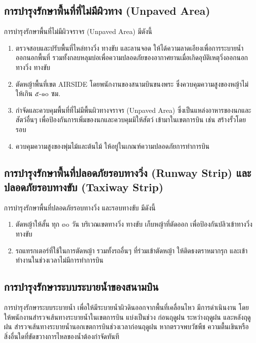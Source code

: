 \subsection{การบำรุงรักษาพื้นที่ที่ไม่มีผิวทาง (Unpaved Area)}\label{การบำรุงรักษาพื้นที่ที่ไม่มีผิวทาง (Unpaved Area)}

การบำรุงรักษาพื้นที่ไม่มีผิวจราจร (Unpaved Area) มีดังนี้

\begin{enumerate}
\item ตรวจสอบและปรับพื้นที่ไหล่ทางวิ่ง ทางขับ และลานจอด ให้ได้ความลาดเอียงเพื่อการระบายน้ำออกนอกพื้นที่ รวมทั้งกลบหลุมบ่อเพื่อความปลอดภัยของอากาศยานเมื่อเกิดอุบัติเหตุวิ่งออกนอกทางวิ่ง ทางขับ
\item ตัดหญ้าพื้นที่เขต AIRSIDE โดยพนักงานของสนามบินขนงพระ ซึ่งควบคุมความสูงของหญ้าไม่ให้เกิน ๕-๑๐ ซม. 
\item กำจัดและควบคุมพื้นที่ที่ไม่มีพื้นผิวทางจราจร (Unpaved Area) ซึ่งเป็นแหล่งอาหารของนกและสัตว์อื่นๆ เพื่อป้องกันการเพิ่มของนกและควบคุมมิให้สัตว์ เข้ามาในเขตการบิน เช่น สร้างรั้วโดยรอบ
\item ควบคุมความสูงของพุ่มไม้และต้นไม้ ให้อยู่ในเกณฑ์ความปลอดภัยการทำการบิน
\end{enumerate}

\subsection{การบำรุงรักษาพื้นที่ปลอดภัยรอบทางวิ่ง (Runway Strip) และปลอดภัยรอบทางขับ (Taxiway Strip)}\label{การบำรุงรักษาพื้นที่ปลอดภัยรอบทางวิ่ง (Runway Strip) และปลอดภัยรอบทางขับ (Taxiway Strip)}

การบำรุงรักษาพื้นที่ปลอดภัยรอบทางวิ่ง และรอบทางขับ มีดังนี้

\begin{enumerate}
\item ตัดหญ้าให้สั้น ทุก ๓๐ วัน บริเวณเขตทางวิ่ง ทางขับ เก็บหญ้าที่ตัดออก เพื่อป้องกันปลิวเข้าทางวิ่ง ทางขับ
\item รถแทรกเตอร์ที่ใช้ในการตัดหญ้า รวมทั้งรถอื่นๆ ที่ร่วมเข้าตัดหญ้า ให้ติดธงตราหมากรุก และเข้าทำงานในช่วงเวลาไม่มีการทำการบิน 
\end{enumerate}

\subsection{การบำรุงรักษาระบบระบายน้ำของสนามบิน}\label{การบำรุงรักษาระบบระบายน้ำของสนามบิน}

การบำรุงรักษาระบบระบายน้ำ เพื่อให้มีระบายน้ำผิวดินออกจากพื้นที่เคลื่อนไหว มีการดำเนินงาน โดย ให้พนักงานสำรวจเส้นทางระบายน้ำในเขตการบิน แบ่งเป็นช่วง ก่อนฤดูฝน ระหว่างฤดูฝน และหลังฤดูฝน สำรวจเส้นทางระบายน้ำนอกเขตการบินช่วงเวลาก่อนฤดูฝน  หากตรวจพบวัชพืช ความตื้นเขินหรือสิ่งอื่นใดที่ขัดขวางการไหลของน้ำต้องกำจัดทันที

